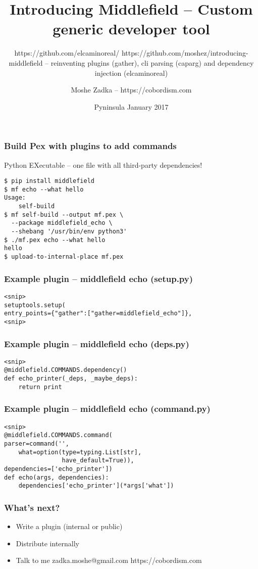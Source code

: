\usepackage[utf8]{inputenc}
\usepackage{listings}

\title{Introducing Middlefield -- Custom generic developer tool}
\subtitle{https://github.com/elcaminoreal/ https://github.com/moshez/introducing-middlefield -- reinventing plugins (gather), cli parsing (caparg) and dependency injection (elcaminoreal)}
\author{Moshe Zadka -- https://cobordism.com}
\date{Pyninsula January 2017}
 

 
\begin{titlepage}
\maketitle
\end{titlepage}

\frame{\titlepage}

\begin{frame}[fragile]
\frametitle{Build Pex with plugins to add commands}
Python EXecutable -- one file with all third-party dependencies!
\begin{lstlisting}
$ pip install middlefield
$ mf echo --what hello
Usage:
    self-build
$ mf self-build --output mf.pex \
  --package middlefield_echo \
  --shebang '/usr/bin/env python3'
$ ./mf.pex echo --what hello 
hello
$ upload-to-internal-place mf.pex
\end{lstlisting}
\end{frame}

\begin{frame}[fragile]
\frametitle{Example plugin -- middlefield echo (setup.py)}
\begin{lstlisting}
<snip>
setuptools.setup(
entry_points={"gather":["gather=middlefield_echo"]},
<snip>
\end{lstlisting}
\end{frame}

\begin{frame}[fragile]
\frametitle{Example plugin -- middlefield echo (deps.py)}
\begin{lstlisting}
<snip>
@middlefield.COMMANDS.dependency()
def echo_printer(_deps, _maybe_deps):
    return print
\end{lstlisting}
\end{frame}

\begin{frame}[fragile]
\frametitle{Example plugin -- middlefield echo (command.py)}
\begin{lstlisting}
<snip>
@middlefield.COMMANDS.command(
parser=command('',
    what=option(type=typing.List[str],
                have_default=True)),
dependencies=['echo_printer'])
def echo(args, dependencies):
    dependencies['echo_printer'](*args['what'])
\end{lstlisting}
\end{frame}

\begin{frame}
\frametitle{What's next?}
\begin{itemize}
\item Write a plugin (internal or public)
\item Distribute internally
\item Talk to me zadka.moshe@gmail.com https://cobordism.com
\end{itemize}
\end{frame}


